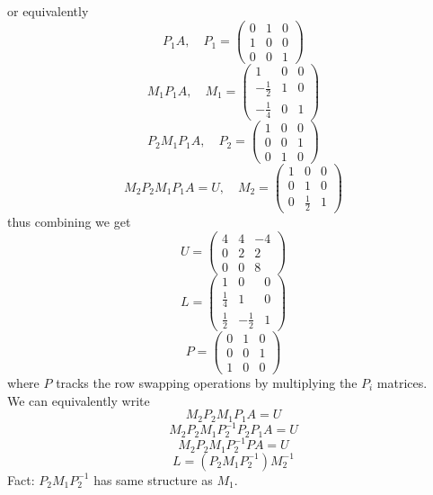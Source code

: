\documentclass[11pt]{article}
\begin{document}
\begin{example}
    or equivalently
    \[
        P_1 A, \quad P_1 = 
        \begin{pmatrix}
            0 & 1 & 0\\
            1 & 0 & 0\\
            0 & 0 & 1
        \end{pmatrix}
    \]
    \[
        M_1P_1A, \quad M_1 = 
        \begin{pmatrix}
            1 & 0 & 0\\
            -\frac{1}{2} & 1 & 0\\
            -\frac{1}{4} & 0 & 1
        \end{pmatrix}
    \]
    \[
        P_2M_1P_1A, \quad P_2 =
        \begin{pmatrix}
            1 & 0 & 0\\
            0 & 0 & 1 \\
            0 & 1 & 0
        \end{pmatrix}
    \]
    \[
        M_2P_2M_1P_1A = U, \quad M_2 = 
        \begin{pmatrix}
            1 & 0 & 0\\
            0 & 1 & 0 \\
            0 & \frac{1}{2} & 1
        \end{pmatrix}
    \]
    thus combining we get
    \[
        U = \begin{pmatrix}
            4 & 4 & -4 \\
            0 & 2 & 2 \\
            0 & 0 & 8
        \end{pmatrix}
    \]
    \[
        L = \begin{pmatrix}
            1 & 0 & 0 \\
            \frac{1}{4} & 1 & 0\\
            \frac{1}{2} & -\frac{1}{2} & 1
        \end{pmatrix}
    \]
    \[
    P = \begin{pmatrix}
        0 & 1 & 0\\
        0 & 0 & 1\\
        1 & 0 & 0
    \end{pmatrix}
    \]
    where $P$ tracks the row swapping operations by multiplying the $P_i$ matrices.\\
    We can equivalently write
    \[
        M_2P_2M_1P_1A = U
    \]
    \[
        M_2P_2M_1P_2^{-1}P_2P_1A = U
    \]
    \[
        M_2P_2M_1P_2^{-1}PA = U
    \]
    \[
        L = (P_2M_1P_2^{-1})M_2^{-1}
    \]
Fact: $P_2M_1P_2^{-1}$ has same structure as $M_1$.

\end{example}
\end{document}
